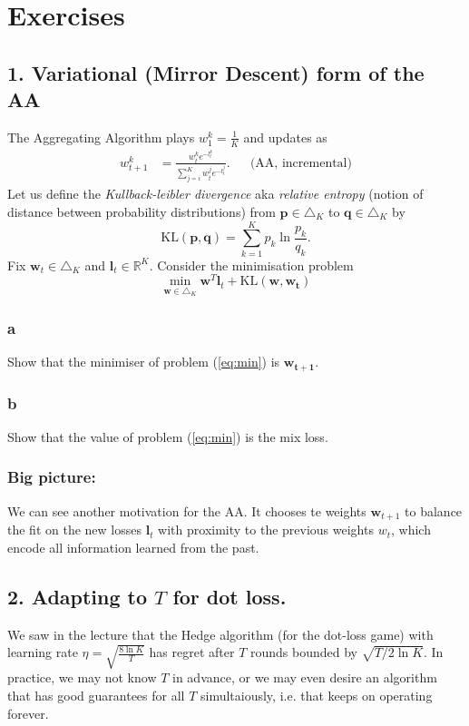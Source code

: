 \documentclass[10pt, a4paper, twoside]{amsart}
\theoremstyle{plain}
\newcommand{\R}{\ensuremath{\mathbb{R}}}
\begin{document}
\section{Exercises}
\subsection*{1. Variational (Mirror Descent) form of the AA}
The Aggregating Algorithm plays $w_1^k = \frac{1}{K}$ and updates as
\begin{align*}
    w_{t+1}^k &= \frac{w_t^k e^{-l_t^k}}{\sum_{j=i}^K w_t^j e^{-l_t^j}}. &&\mbox{(AA, incremental)}
\end{align*}
Let us define the \textit{Kullback-leibler divergence} aka \textit{relative entropy} (notion of distance between probability distributions) from $\mathbf{p} \in \triangle_K$ to $\mathbf{q} \in \triangle_K$ by
\begin{equation*}
    \mbox{KL}(\mathbf{p}, \mathbf{q}) = \sum_{k=1}^K p_k \ln \frac{p_k}{q_k}.
\end{equation*}
Fix $\mathbf{w}_t \in \triangle_K$ and $\mathbf{l}_t \in \R^K$. Consider the minimisation problem 
\begin{equation} \label{eq:min}
    \min_{\mathbf{w} \in \triangle_K} \mathbf{w}^T\mathbf{l}_t + \mbox{KL}(\mathbf{w}, \mathbf{w_t})
\end{equation}
\subsubsection*{a}
Show that the minimiser of problem (\ref{eq:min}) is $\mathbf{w_{t+1}}$.
\subsubsection*{b}
Show that the value of problem (\ref{eq:min}) is the mix loss.

\subsubsection*{Big picture:}
We can see another motivation for the AA. It chooses te weights $\mathbf{w}_{t+1}$ to balance the fit on the new losses $\mathbf{l}_t$ with proximity to the previous weights $w_t$, which encode all information learned from the past. 

\subsection*{2. Adapting to $T$ for dot loss.}
We saw in the lecture that the Hedge algorithm (for the dot-loss game) with learning rate $\eta = \sqrt{\frac{8\ln K}{T}}$ has regret after $T$ rounds bounded by $\sqrt{T/ 2 \ln K}$. In practice, we may not know $T$ in advance, or we may even desire an algorithm that has good guarantees for all $T$ simultaiously, i.e. that keeps on operating forever.
\end{document}
